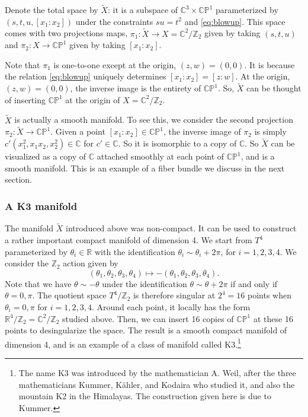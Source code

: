 \documentclass[12pt]{article}
\numberwithin{equation}{section}
\theoremstyle{remark}
\def\bC{\mathbb{C}}
\def\bR{\mathbb{R}}
\def\bZ{\mathbb{Z}}
\def\CP{\mathbb{CP}}
\begin{document}
Denote the total space by $\tilde X$: 
it is a subspace of $\bC^3\times \CP^1$ 
parameterized by 
$(s,t,u,[x_1:x_2])$ 
under the constraints $su=t^2$ and \eqref{eq:blowup}.
This space comes with two projections maps, $\pi_1:\tilde X\to X=\bC^2/\bZ_2$ 
given by taking $(s,t,u)$
and $\pi_2:X\to \CP^1$ given by taking $[x_1:x_2]$.

Note that $\pi_1$ is one-to-one except at the origin, $(z,w)=(0,0)$.
It is because the relation \eqref{eq:blowup} uniquely determines $[x_1:x_2]=[z:w]$.
At the origin, $(z,w)=(0,0)$, the inverse image is the entirety of $\CP^1$. 
So, $\tilde X$ can be thought of inserting  $\CP^1$ at the origin of $X=\bC^2/\bZ_2$.

$\tilde X$ is actually a smooth manifold.
To see this, we consider the second projection $\pi_2: \tilde X\to \CP^1$.
Given a point $[x_1:x_2]\in \CP^1$,
the inverse image of $\pi_2$ is simply $c'(x_1^2, x_1 x_2, x_2^2)\in \bC$
for $c'\in \bC$. 
So it is isomorphic to a copy of $\bC$.
So $\tilde X$ can be visualized as a copy of $\bC$ attached smoothly at each point of $\CP^1$,
and is a smooth manifold.
This is an example of a fiber bundle we discuss in the next section.

\subsubsection{A K3 manifold}

The manifold $\tilde X$ introduced above was non-compact. 
It can be used to construct a rather important compact manifold of dimension 4.
We start from $T^4$ parameterized by $\theta_i\in \bR$ with the identification $\theta_i\sim \theta_i+2\pi$, for $i=1,2,3,4$.
We consider the $\bZ_2$ action given by \begin{equation}
  (\theta_1,\theta_2,\theta_3,\theta_4) \mapsto -(\theta_1,\theta_2,\theta_3,\theta_4).
\end{equation}
Note that we have $\theta \sim -\theta$ under the identification $\theta\sim \theta+2\pi$ if and only if $\theta=0,\pi$.
The quotient space $T^4/\bZ_2$ is therefore singular at $2^4=16$ points
when $\theta_i = 0,\pi$ for $i=1,2,3,4$.
Around each point, it locally has the form $\bR^4/\bZ_2 = \bC^2/\bZ_2$ studied above.
Then, we can insert 16 copies of $\CP^1$ at these 16 points to desingularize the space.
The result is a smooth compact manifold of dimension 4, 
and is an example of a class of manifold called K3.\footnote{%
The name K3 was introduced by the mathematician A. Weil, after the three mathematicians 
Kummer, K\"ahler, and Kodaira who studied it, and also the mountain K2 in the Himalayas.
The construction given here is due to Kummer.
}
\end{document}

